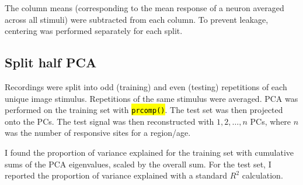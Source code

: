 \documentclass[
  10pt,
  letterpaper,
  DIV=11,
  numbers=noendperiod]{scrartcl}
\let\OldTexttt\texttt
\renewcommand{\texttt}[1]{\OldTexttt{\hl{#1}}}
\begin{document}
The column means (corresponding to the mean response of a neuron
averaged across all stimuli) were subtracted from each column. To
prevent leakage, centering was performed separately for each split.

\subsection{Split half PCA}\label{split-half-pca}

Recordings were split into odd (training) and even (testing) repetitions
of each unique image stimulus. Repetitions of the same stimulus were
averaged. PCA was performed on the training set with \texttt{prcomp()}.
The test set was then projected onto the PCs. The test signal was then
reconstructed with \(1, 2, \dots, n\) PCs, where \(n\) was the number of
responsive sites for a region/age.

I found the proportion of variance explained for the training set with
cumulative sums of the PCA eigenvalues, scaled by the overall sum. For
the test set, I reported the proportion of variance explained with a
standard \(R^2\) calculation.
\end{document}
